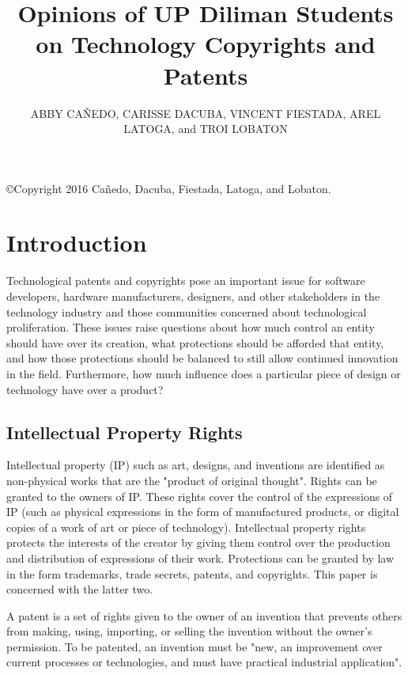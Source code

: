 \documentclass[prodmode,cs196]{acmlarge}
\title{Opinions of UP Diliman Students on Technology Copyrights and Patents}
\author{ABBY CA\~{N}EDO, CARISSE DACUBA, VINCENT FIESTADA, AREL LATOGA, and TROI LOBATON \affil{University of the Philippines Diliman}}
\begin{document}
\begin{bottomstuff}
\copyright Copyright 2016 Ca\~{n}edo, Dacuba, Fiestada, Latoga, and Lobaton.
\end{bottomstuff}


\maketitle

\section{Introduction}

Technological patents and copyrights pose an important issue for software developers, hardware manufacturers, designers, and other stakeholders in the technology industry and those communities concerned about technological proliferation. These issues raise questions about how much control an entity should have over its creation, what protections should be afforded that entity, and how those protections should be balanced to still allow continued innovation in the field. Furthermore, how much influence does a particular piece of design or technology have over a product? 

\subsection{Intellectual Property Rights}

Intellectual property (IP) such as art, designs, and inventions are identified as non-physical works that are the "product of original thought". Rights can be granted to the owners of IP. These rights cover the control of the expressions of IP (such as physical expressions in the form of manufactured products, or digital copies of a work of art or piece of technology). Intellectual property rights protects the interests of the creator by giving them control over the production and distribution of expressions of their work. \cite{MooreHimmaIP} Protections can be granted by law in the form trademarks, trade secrets, patents, and copyrights. This paper is concerned with the latter two.

A patent is a set of rights given to the owner of an invention that prevents others from making, using, importing, or selling the invention without the owner's permission. To be patented, an invention must be "new, an improvement over current processes or technologies, and must have practical industrial application". \cite{IPOSPatent} 
\end{document}

